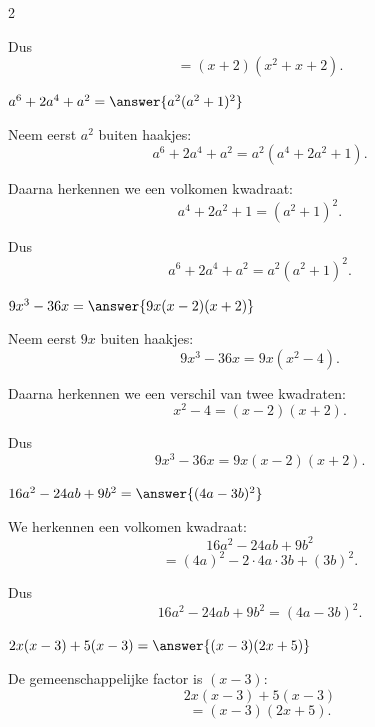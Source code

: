 \documentclass{ximera}
\begin{document}
\begin{oefening}{\oefU\ESS}
\begin{multicols}{2}
\begin{question}
\begin{oplossing}
    Dus
    \[
    =(x+2)(x^2+x+2).
    \]
    \end{oplossing}
    \end{question}
    
    
    \begin{question}
    $a^6+2a^4+a^2=\answer{a^2(a^2+1)^2}$
    
    \begin{oplossing}
    Neem eerst $a^2$ buiten haakjes:
    \[
    a^6+2a^4+a^2
    =a^2(a^4+2a^2+1).
    \]
    
    Daarna herkennen we een volkomen kwadraat:
    \[
    a^4+2a^2+1
    =(a^2+1)^2.
    \]
    
    Dus
    \[
    a^6+2a^4+a^2
    =a^2(a^2+1)^2.
    \]
    \end{oplossing}
    \end{question}
    
    
    \begin{question}
    $9x^3-36x=\answer{9x(x-2)(x+2)}$
    
    \begin{oplossing}
    Neem eerst $9x$ buiten haakjes:
    \[
    9x^3-36x
    =9x(x^2-4).
    \]
    
    Daarna herkennen we een verschil van twee kwadraten:
    \[
    x^2-4=(x-2)(x+2).
    \]
    
    Dus
    \[
    9x^3-36x
    =9x(x-2)(x+2).
    \]
    \end{oplossing}
    \end{question}
    
    
    \begin{question}
    $16a^2-24ab+9b^2
    =\answer{(4a-3b)^2}$
    
    \begin{oplossing}
    We herkennen een volkomen kwadraat:
    \[
    16a^2-24ab+9b^2
    \]
    \[
    =(4a)^2-2\cdot4a\cdot3b+(3b)^2.
    \]
    
    Dus
    \[
    16a^2-24ab+9b^2
    =(4a-3b)^2.
    \]
    \end{oplossing}
    \end{question}
    
    
    \begin{question}
    $2x(x-3)+5(x-3)
    =\answer{(x-3)(2x+5)}$
    
    \begin{oplossing}
    De gemeenschappelijke factor is $(x-3)$:
    \[
    2x(x-3)+5(x-3)
    \]
    \[
    =(x-3)(2x+5).
    \]
    \end{oplossing}
    \end{question}
    

\end{multicols}
\end{oefening}
\end{document}
